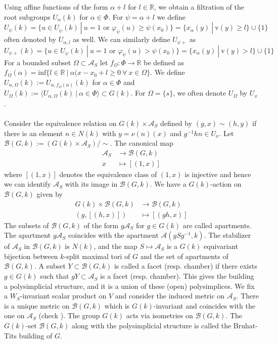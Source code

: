 \documentclass[11 pt]{article}
\numberwithin{equation}{subsection}
\theoremstyle{definition}
\theoremstyle{remark}
\theoremstyle{conjecture}
\newcommand{\rv}{\mathrm{v}}
\newcommand{\R}{\mathbb R}
\newcommand{\A}{\mathcal A}
\newcommand{\B}{\mathcal{B}}
\begin{document}
Using affine functions of the form $\alpha +l$ for $l \in \R$, we obtain a filtration of the root subgroups $U_\alpha(k) $ for $\alpha \in \Phi$. For $\psi =\alpha +l$ we define 
\begin{equation*}
    U_{\psi}(k)=\{ u \in U_{\dot\psi}(k)\:|\: u=1 \text{ or } \varphi_{\dot\psi}(u)\geq \psi(x_0)\}= \{x_\alpha(y)\:|\: \rv(y)\geq l\} \cup \{1\}
\end{equation*}
often denoted by $U_{\alpha,l}$ as well. We can similarly define $U_{\psi +}$ as 
\begin{equation*}
    U_{\psi +}(k)=\{ u \in U_{\dot\psi}(k)\:|\: u=1 \text{ or } \varphi_{\dot\psi}(u)> \psi(x_0)\}= \{x_\alpha(y)\:|\: \rv(y)> l\} \cup \{1\}
\end{equation*}
For a bounded subset $\Omega \subset \A_S$ let $f_{\Omega}: \Phi\rightarrow \R$ be defined as $f_\Omega(\alpha)=\mathrm{inf}\{ l \in \R\:|\: \alpha(x-x_0+l\geq 0 \:\forall \: x \in \Omega\}$. We define $U_{\alpha,\Omega}(k):= U_{\alpha, f_\Omega(\alpha)}(k)$ for $\alpha \in \Phi$ and $U_\Omega(k):=\langle U_{\alpha,\Omega}(k)\:|\: \alpha \in \Phi \rangle \subset G(k)$. For $\Omega = \{s\}$, we often denote $U_\Omega$ by $U_x$. \paragraph{}
Consider the equivalence relation on $G(k)\times \A_S$ defined by $(g,x)\sim (h,y)$ if there is an element $n \in N(k)$ with $y = \nu(n)(x)$ and $g^{-1}hn\in U_x$. Let $\B(G,k):= (G(k)\times \A_S)/\sim $. The canonical map 
\begin{align*}
    \A_S &\rightarrow \B(G,k)\\
    x &\mapsto [(1,x)]
\end{align*}
where $[(1,x)]$ denotes the equivalence class of $(1,x)$ is injective and hence we can identify $\A_S$ with its image in $\B(G,k)$. We have a $G(k)$-action on $\B(G,k)$ given by 
\begin{align*}
    G(k) \times \B(G,k) & \rightarrow \B(G,k)\\
    (g, [(h,x)]) &\mapsto [(gh,x)]
\end{align*}
The subsets of $\B(G,k)$ of the form $g\A_S$ for $g \in G(k)$ are called apartments. The apartment $g\A_S$ coincides with the apartment $\A(gSg^{-1},k)$. The stabilizer of $\A_S$ in $\B(G,k)$ is $N(k)$, and the map $S \mapsto \A_S$ is a $G(k)$ equivariant bijection between $k$-split maximal tori of $G$ and the set of apartments of $\B(G,k)$. A subset $Y \subset \B(G,k)$ is called a facet (resp. chamber) if there exists $g \in G(k)$ such that $gY \subset \A_S$ is a facet (resp. chamber). This gives the building a polysimplicial structure, and it is a union of these (open) polysimplices. We fix a $W_S$-invariant scalar product on $V$ and consider the induced metric on $\A_S$. There is a unique metric on $\B(G,k)$ which is $G(k)$-invariant and coincides with the one on $\A_S$ (check \cite[Section 13.14]{landvogtcompactificationbook}). The group $G(k)$ acts via isometries on $\B(G,k)$. The $G(k)$-set $\B(G,k)$ along with the polysimplicial structure is called the Bruhat-Tits building of $G$.
\end{document}

